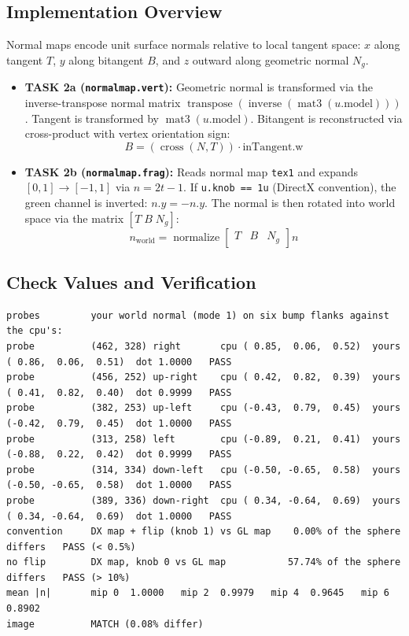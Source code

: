 \documentclass[10pt,a4paper]{article}
\begin{document}
\subsection{Implementation Overview}
Normal maps encode unit surface normals relative to local tangent space: $x$ along tangent $T$, $y$ along bitangent $B$, and $z$ outward along geometric normal $N_g$.
\begin{itemize}
    \item \textbf{TASK 2a (\texttt{normalmap.vert}):} Geometric normal is transformed via the inverse-transpose normal matrix $\operatorname{transpose}(\operatorname{inverse}(\operatorname{mat3}(u.\text{model})))$. Tangent is transformed by $\operatorname{mat3}(u.\text{model})$. Bitangent is reconstructed via cross-product with vertex orientation sign:
    \[
    B = (\operatorname{cross}(N, T)) \cdot \text{inTangent.w}
    \]
    \item \textbf{TASK 2b (\texttt{normalmap.frag}):} Reads normal map \texttt{tex1} and expands $[0, 1] \to [-1, 1]$ via $n = 2t - 1$. If \texttt{u.knob == 1u} (DirectX convention), the green channel is inverted: $n.y = -n.y$. The normal is then rotated into world space via the matrix $[T \; B \; N_g]$:
    \[
    n_{\text{world}} = \operatorname{normalize}\begin{bmatrix} T & B & N_g \end{bmatrix} n
    \]
\end{itemize}

\subsection{Check Values and Verification}
\begin{lstlisting}[caption={Automated Verification Output for Part II (make normalmap)}]
probes         your world normal (mode 1) on six bump flanks against the cpu's:
probe          (462, 328) right       cpu ( 0.85,  0.06,  0.52)  yours ( 0.86,  0.06,  0.51)  dot 1.0000   PASS
probe          (456, 252) up-right    cpu ( 0.42,  0.82,  0.39)  yours ( 0.41,  0.82,  0.40)  dot 0.9999   PASS
probe          (382, 253) up-left     cpu (-0.43,  0.79,  0.45)  yours (-0.42,  0.79,  0.45)  dot 1.0000   PASS
probe          (313, 258) left        cpu (-0.89,  0.21,  0.41)  yours (-0.88,  0.22,  0.42)  dot 0.9999   PASS
probe          (314, 334) down-left   cpu (-0.50, -0.65,  0.58)  yours (-0.50, -0.65,  0.58)  dot 1.0000   PASS
probe          (389, 336) down-right  cpu ( 0.34, -0.64,  0.69)  yours ( 0.34, -0.64,  0.69)  dot 1.0000   PASS
convention     DX map + flip (knob 1) vs GL map    0.00% of the sphere differs   PASS (< 0.5%)
no flip        DX map, knob 0 vs GL map           57.74% of the sphere differs   PASS (> 10%)
mean |n|       mip 0  1.0000   mip 2  0.9979   mip 4  0.9645   mip 6  0.8902
image          MATCH (0.08% differ)
\end{lstlisting}
\end{document}

